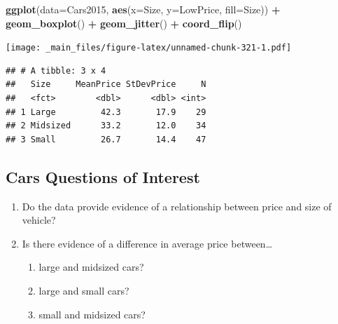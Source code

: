 \documentclass[]{book}
\newenvironment{Shaded}{\begin{snugshade}}{\end{snugshade}}
\newcommand{\KeywordTok}[1]{\textcolor[rgb]{0.13,0.29,0.53}{\textbf{#1}}}
\newcommand{\DataTypeTok}[1]{\textcolor[rgb]{0.13,0.29,0.53}{#1}}
\newcommand{\StringTok}[1]{\textcolor[rgb]{0.31,0.60,0.02}{#1}}
\newcommand{\OperatorTok}[1]{\textcolor[rgb]{0.81,0.36,0.00}{\textbf{#1}}}
\newcommand{\NormalTok}[1]{#1}
\providecommand{\tightlist}{%
  \setlength{\itemsep}{0pt}\setlength{\parskip}{0pt}}
\begin{document}
\begin{Shaded}
\begin{Highlighting}[]
\KeywordTok{ggplot}\NormalTok{(}\DataTypeTok{data=}\NormalTok{Cars2015, }\KeywordTok{aes}\NormalTok{(}\DataTypeTok{x=}\NormalTok{Size, }\DataTypeTok{y=}\NormalTok{LowPrice, }\DataTypeTok{fill=}\NormalTok{Size)) }\OperatorTok{+}\StringTok{ }
\StringTok{  }\KeywordTok{geom_boxplot}\NormalTok{() }\OperatorTok{+}\StringTok{ }\KeywordTok{geom_jitter}\NormalTok{() }\OperatorTok{+}\StringTok{ }\KeywordTok{coord_flip}\NormalTok{()}
\end{Highlighting}
\end{Shaded}

\texttt{[image: \_main\_files/figure-latex/unnamed-chunk-321-1.pdf]}

\begin{Shaded}
\end{Shaded}

\begin{verbatim}
## # A tibble: 3 x 4
##   Size     MeanPrice StDevPrice     N
##   <fct>        <dbl>      <dbl> <int>
## 1 Large         42.3       17.9    29
## 2 Midsized      33.2       12.0    34
## 3 Small         26.7       14.4    47
\end{verbatim}

\subsection{Cars Questions of
Interest}\label{cars-questions-of-interest}

\begin{enumerate}
\def\labelenumi{\arabic{enumi}.}
\item
  Do the data provide evidence of a relationship between price and size
  of vehicle?
\item
  Is there evidence of a difference in average price between\ldots{}

  \begin{enumerate}
  \def\labelenumii{\alph{enumii})}
  \tightlist
  \item
    large and midsized cars?\\
  \item
    large and small cars?\\
  \item
    small and midsized cars?
  \end{enumerate}
\end{enumerate}
\end{document}
